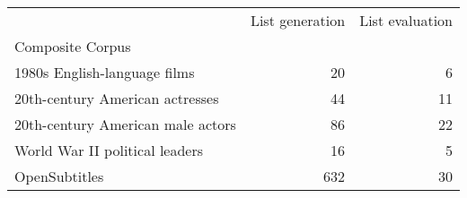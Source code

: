 \begin{tabular}{lrr}
\toprule
 & List generation & List evaluation \\
Composite Corpus &  &  \\
\midrule
1980s English-language films & 20 & 6 \\
20th-century American actresses & 44 & 11 \\
20th-century American male actors & 86 & 22 \\
World War II political leaders & 16 & 5 \\
OpenSubtitles & 632 & 30 \\
\bottomrule
\end{tabular}
